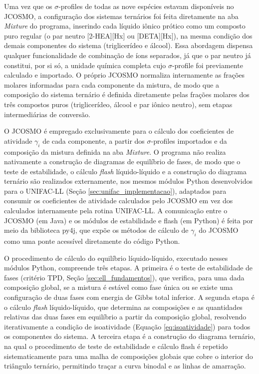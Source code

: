 Uma vez que os $\sigma$-profiles de todas as nove espécies estavam disponíveis no JCOSMO, a configuração dos sistemas ternários foi feita diretamente na aba \textit{Mixture} do programa, inserindo cada líquido iônico prótico como um composto puro regular (o par neutro [2-HEA][Hx] ou [DETA][Hx]), na mesma condição dos demais componentes do sistema (triglicerídeo e álcool). Essa abordagem dispensa qualquer funcionalidade de combinação de íons separados, já que o par neutro já constitui, por si só, a unidade química completa cujo $\sigma$-profile foi previamente calculado e importado. O próprio JCOSMO normaliza internamente as frações molares informadas para cada componente da mistura, de modo que a composição do sistema ternário é definida diretamente pelas frações molares dos três compostos puros (triglicerídeo, álcool e par iônico neutro), sem etapas intermediárias de conversão.


O JCOSMO é empregado exclusivamente para o cálculo dos coeficientes de atividade $\gamma_i$ de cada componente, a partir dos $\sigma$-profiles importados e da composição da mistura definida na aba \textit{Mixture}. O programa não realiza nativamente a construção de diagramas de equilíbrio de fases, de modo que o teste de estabilidade, o cálculo \textit{flash} líquido-líquido e a construção do diagrama ternário são realizados externamente, nos mesmos módulos Python desenvolvidos para o UNIFAC-LL (Seção \ref{sec:unifac_implementacao}), adaptados para consumir os coeficientes de atividade calculados pelo JCOSMO em vez dos calculados internamente pela rotina UNIFAC-LL. A comunicação entre o JCOSMO (em Java) e os módulos de estabilidade e flash (em Python) é feita por meio da biblioteca py4j, que expõe os métodos de cálculo de $\gamma_i$ do JCOSMO como uma ponte acessível diretamente do código Python.

O procedimento de cálculo do equilíbrio líquido-líquido, executado nesses módulos Python, compreende três etapas. A primeira é o teste de estabilidade de fases (critério TPD, Seção \ref{sec:ell_fundamentos}), que verifica, para uma dada composição global, se a mistura é estável como fase única ou se existe uma configuração de duas fases com energia de Gibbs total inferior. A segunda etapa é o cálculo \textit{flash} líquido-líquido, que determina as composições e as quantidades relativas das duas fases em equilíbrio a partir da composição global, resolvendo iterativamente a condição de isoatividade (Equação \ref{eq:isoatividade}) para todos os componentes do sistema. A terceira etapa é a construção do diagrama ternário, na qual o procedimento de teste de estabilidade e cálculo flash é repetido sistematicamente para uma malha de composições globais que cobre o interior do triângulo ternário, permitindo traçar a curva binodal e as linhas de amarração.

